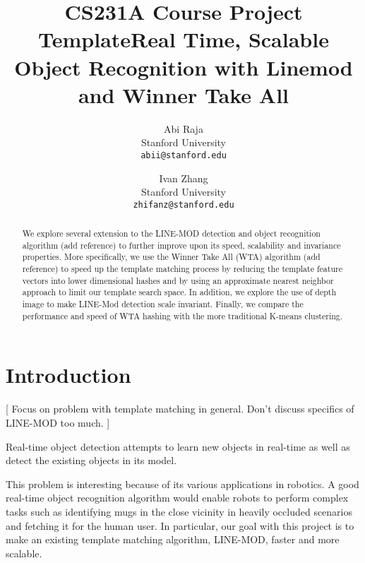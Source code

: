 \documentclass[10pt,twocolumn,letterpaper]{article}
\begin{document}
\title{CS231A Course Project Template}

\title{Real Time, Scalable Object Recognition with Linemod and Winner Take All}
\author{
Abi Raja\\
Stanford University\\
{\tt\small abii@stanford.edu}
\and
Ivan Zhang\\
Stanford University\\
{\tt\small zhifanz@stanford.edu}
}
\maketitle

\maketitle
\thispagestyle{empty}

\begin{abstract}
    We explore several extension to the LINE-MOD detection and object
    recognition algorithm (add reference) to further improve upon its
    speed, scalability and invariance properties. More specifically,
    we use the Winner Take All (WTA) algorithm (add reference) to
    speed up the template matching process by reducing the template
    feature vectors into lower dimensional hashes and by using an
    approximate nearest neighbor approach to limit our template search
    space. In addition, we explore the use of depth image to make
    LINE-Mod detection scale invariant. Finally, we compare the
    performance and speed of WTA hashing with the more traditional
    K-means clustering.
\end{abstract}

\section{Introduction}

[ Focus on problem with template matching in general. Don't discuss specifics of LINE-MOD too much.
]

Real-time object detection attempts to learn new objects in real-time as well as detect the existing objects in its model.

This problem is interesting because of its various applications in robotics. A good real-time object recognition algorithm would enable robots to perform complex tasks such as identifying mugs in the close vicinity in heavily occluded scenarios and fetching it for the human user. In particular, our goal with this project is to make an existing template matching algorithm, LINE-MOD, faster and more scalable.
\end{document}
